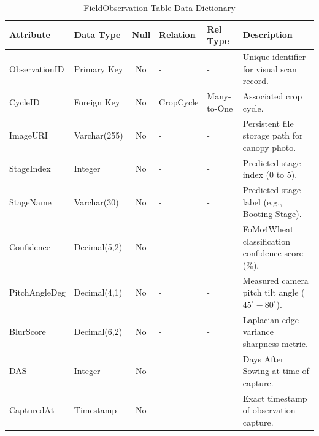 \documentclass{FastFyp}
\begin{document}
\begin{table}[H]
\footnotesize
\centering
\caption{FieldObservation Table Data Dictionary}
\label{tab:observation_table}
\begin{tabular}{|l|l|c|l|l|p{4.5cm}|}
\hline
\textbf{Attribute} & \textbf{Data Type} & \textbf{Null} & \textbf{Relation} & \textbf{Rel Type} & \textbf{Description} \\ \hline
ObservationID & Primary Key & No & - & - & Unique identifier for visual scan record. \\ \hline
CycleID & Foreign Key & No & CropCycle & Many-to-One & Associated crop cycle. \\ \hline
ImageURI & Varchar(255) & No & - & - & Persistent file storage path for canopy photo. \\ \hline
StageIndex & Integer & No & - & - & Predicted stage index ($0$ to $5$). \\ \hline
StageName & Varchar(30) & No & - & - & Predicted stage label (e.g., Booting Stage). \\ \hline
Confidence & Decimal(5,2) & No & - & - & FoMo4Wheat classification confidence score (\%). \\ \hline
PitchAngleDeg & Decimal(4,1) & No & - & - & Measured camera pitch tilt angle ($45^\circ - 80^\circ$). \\ \hline
BlurScore & Decimal(6,2) & No & - & - & Laplacian edge variance sharpness metric. \\ \hline
DAS & Integer & No & - & - & Days After Sowing at time of capture. \\ \hline
CapturedAt & Timestamp & No & - & - & Exact timestamp of observation capture. \\ \hline
\end{tabular}
\end{table}
\end{document}
